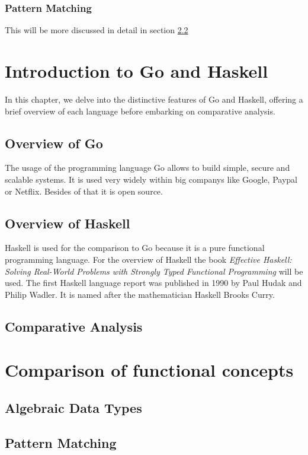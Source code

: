         \subsection{Pattern Matching}
        This will be more discussed in detail in section \ref{sec:pattern-matching}


\chapter{Introduction to Go and Haskell}\label{chap:language-comparison}
In this chapter, we delve into the distinctive features of Go and Haskell, offering a brief overview of each language before embarking on comparative analysis.

    \section{Overview of Go}\label{sec:go-overview}
    The usage of the programming language Go allows to build simple, secure and scalable systems. It is used very widely within big companys like Google, Paypal or Netflix. Besides of that it is open source. \cite{GoWebsite}
    \section{Overview of Haskell}\label{sec:haskell-overview}
    Haskell is used for the comparison to Go because it is a pure functional programming language.
    For the overview of Haskell the book \textit{Effective Haskell: Solving Real-World Problems with Strongly Typed Functional Programming} \cite{Skinner} will be used.
    The first Haskell language report was published in 1990 by Paul Hudak and Philip Wadler. It is named after the mathematician Haskell Brooks Curry.\cite{Hudak2007}

    \section{Comparative Analysis}\label{sec:comparative-analysis}


\chapter{Comparison of functional concepts}
    \section{Algebraic Data Types}\label{sec:algebraic-data-types}
    \section{Pattern Matching}\label{sec:pattern-matching}

